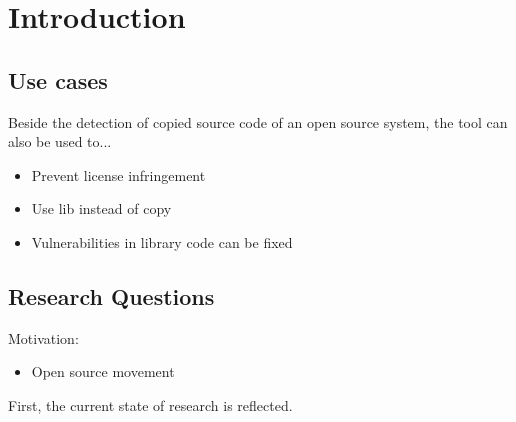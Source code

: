 
\chapter{Introduction}\label{chapter:introduction}

\section{Use cases}\label{section:introduction/use_cases}
Beside the detection of copied source code of an open source system, the tool can also be used to...
\begin{itemize}
	\item Prevent license infringement
	\item Use lib instead of copy
	\item Vulnerabilities in library code can be fixed
\end{itemize}

\section{Research Questions}\label{section:introduction/research_questions}

Motivation:
\begin{itemize}
    \item Open source movement
\end{itemize}


First, the current state of research is reflected.

